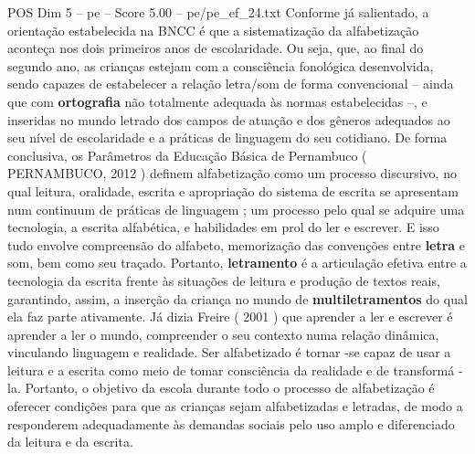 \begin{textsample}{POS Dim 5 – pe – Score 5.00 – pe/pe\_ef\_24.txt}
Conforme já salientado, a orientação estabelecida na BNCC é que a sistematização da alfabetização aconteça nos dois primeiros anos de escolaridade.
Ou seja, que, ao final do segundo ano, as crianças estejam com a consciência fonológica desenvolvida, sendo capazes de estabelecer a relação letra/som de forma convencional – ainda que com \textbf{ortografia} não totalmente adequada às normas estabelecidas –, e inseridas no mundo letrado dos campos de atuação e dos gêneros adequados ao seu nível de escolaridade e a práticas de linguagem do seu cotidiano.
De forma conclusiva, os Parâmetros da Educação Básica de Pernambuco ( PERNAMBUCO, 2012 ) definem alfabetização como um processo discursivo, no qual leitura, oralidade, escrita e apropriação do sistema de escrita se apresentam num continuum de práticas de linguagem ; um processo pelo qual se adquire uma tecnologia, a escrita alfabética, e habilidades em prol do ler e escrever.
E isso tudo envolve compreensão do alfabeto, memorização das convenções entre \textbf{letra} e som, bem como seu traçado.
Portanto, \textbf{letramento} é a articulação efetiva entre a tecnologia da escrita frente às situações de leitura e produção de textos reais, garantindo, assim, a inserção da criança no mundo de \textbf{multiletramentos} do qual ela faz parte ativamente.
Já dizia Freire ( 2001 ) que aprender a ler e escrever é aprender a ler o mundo, compreender o seu contexto numa relação dinâmica, vinculando linguagem e realidade.
Ser alfabetizado é tornar -se capaz de usar a leitura e a escrita como meio de tomar consciência da realidade e de transformá -la.
Portanto, o objetivo da escola durante todo o processo de alfabetização é oferecer condições para que as crianças sejam alfabetizadas e letradas, de modo a responderem adequadamente às demandas sociais pelo uso amplo e diferenciado da leitura e da escrita.

\end{textsample}
